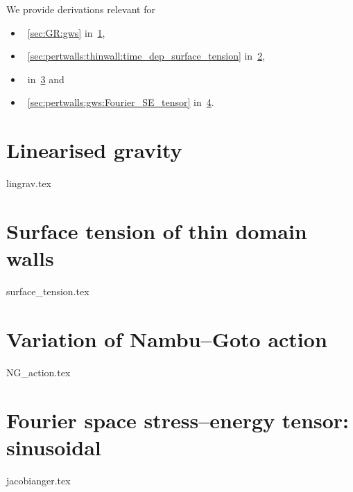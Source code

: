 




We provide derivations relevant for
\begin{itemize}
    \item~\cref{sec:GR:gws} in~\cref{app:derivations:gws},
    \item~\cref{sec:pertwalls:thinwall:time_dep_surface_tension} in~\cref{app:derivations:surface_tension},
    \item~\blahblah in~\cref{app:derivations:NG_action} and
    \item~\cref{sec:pertwalls:gws:Fourier_SE_tensor} in~\cref{app:derivations:jacobianger}.
\end{itemize}



\section{Linearised gravity}\label{app:derivations:gws}
    {{lingrav.tex}}


\section{Surface tension of thin domain walls}\label{app:derivations:surface_tension}
    {{surface_tension.tex}}


    
\section{Variation of Nambu--Goto action}\label{app:derivations:NG_action}
    {{NG_action.tex}}

    


\section{Fourier space stress--energy tensor: sinusoidal}\label{app:derivations:jacobianger}
    {{jacobianger.tex}}


